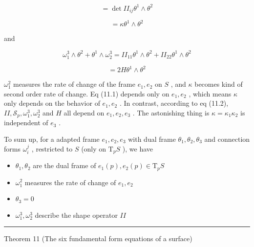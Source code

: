 \documentclass[lang=cn,a4paper,11pt,openany,twoside]{elegantbook}
\newcommand{\HRule}{\begin{center}\rule{0.9\linewidth}{0.2mm}\end{center}}
\begin{document}
\[
= \det I{I}_{ij}{\theta }^{1} \land  {\theta }^{2}
\]

\[
= \kappa {\theta }^{1} \land  {\theta }^{2}
\]

and

\[
{\omega }_{1}^{3} \land  {\theta }^{2} + {\theta }^{1} \land  {\omega }_{2}^{3} = I{I}_{11}{\theta }^{1} \land  {\theta }^{2} + I{I}_{22}{\theta }^{1} \land  {\theta }^{2}
\]

\[
= {2H}{\theta }^{1} \land  {\theta }^{2}
\]

\({\omega }_{1}^{2}\) measures the rate of change of the frame \({e}_{1},{e}_{2}\) on \(S\) , and \(\kappa\) becomes kind of second order rate of change. Eq (11.1) depends only on \({e}_{1},{e}_{2}\) , which means \(\kappa\) only depends on the behavior of \({e}_{1},{e}_{2}\) . In contrast, according to eq (11.2), \({II},{\mathcal{S}}_{p},{\omega }_{1}^{3},{\omega }_{2}^{3}\) and \(H\) all depend on \({e}_{1},{e}_{2},{e}_{3}\) . The astonishing thing is \(\kappa  = {\kappa }_{1}{\kappa }_{2}\) is independent of \({e}_{3}\) .

To sum up, for a adapted frame \({e}_{1},{e}_{2},{e}_{3}\) with dual frame \({\theta }_{1},{\theta }_{2},{\theta }_{3}\) and connection forms \({\omega }_{i}^{j}\) , restricted to \(S\) (only on \({\mathrm{T}}_{p}S\) ), we have

\begin{itemize}\relax
\item\relax \({\theta }_{1},{\theta }_{2}\) are the dual frame of \({e}_{1}\left( p\right) ,{e}_{2}\left( p\right)  \in  {\mathrm{T}}_{p}S\)
\end{itemize}

\begin{itemize}\relax
\item\relax \({\omega }_{1}^{2}\) measures the rate of change of \({e}_{1},{e}_{2}\)
\end{itemize}

\begin{itemize}\relax
\item\relax \({\theta }_{3} = 0\)
\end{itemize}

\begin{itemize}\relax
\item\relax \({\omega }_{1}^{3},{\omega }_{2}^{3}\) describe the shape operator \({II}\)
\end{itemize}

\HRule

Theorem 11 (The six fundamental form equations of a surface)
\end{document}
